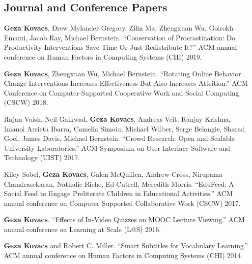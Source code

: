 \documentclass[margin,line]{resume}
\begin{document}
\begin{resume}


\section{\mysidestyle Journal and Conference Papers}


\textbf{Geza Kovacs}, Drew Mylander Gregory, Zilin Ma, Zhengxuan Wu, Golrokh Emami, Jacob Ray, Michael Bernstein. ``Conservation of Procrastination: Do Productivity Interventions Save Time Or Just Redistribute It?'' ACM annual conference on Human Factors in Computing Systems (CHI) 2019. %

\textbf{Geza Kovacs}, Zhengxuan Wu, Michael Bernstein. ``Rotating Online Behavior Change Interventions Increases Effectiveness But Also Increases Attrition.'' ACM Conference on Computer-Supported Cooperative Work and Social Computing (CSCW) 2018. %

Rajan Vaish, Neil Gaikwad, \textbf{Geza Kovacs}, Andreas Veit, Ranjay Krishna, Imanol Arrieta Ibarra, Camelia Simoiu, Michael Wilber, Serge Belongie, Sharad Goel, James Davis, Michael Bernstein. ``Crowd Research: Open and Scalable University Laboratories.'' ACM Symposium on User Interface Software and Technology (UIST) 2017. %

Kiley Sobel, \textbf{Geza Kovacs}, Galen McQuillen, Andrew Cross, Nirupama Chandrasekaran, Nathalie Riche, Ed Cutrell, Meredith Morris. ``EduFeed: A Social Feed to Engage Preliterate Children in Educational Activities.'' ACM annual conference on Computer Supported Collaborative Work (CSCW) 2017. %

\textbf{Geza Kovacs}. ``Effects of In-Video Quizzes on MOOC Lecture Viewing.'' ACM annual conference on Learning at Scale (L@S) 2016. %

\textbf{Geza Kovacs} and Robert C. Miller. ``Smart Subtitles for Vocabulary Learning.'' ACM annual conference on Human Factors in Computing Systems (CHI) 2014. %


\end{resume}
\end{document}

